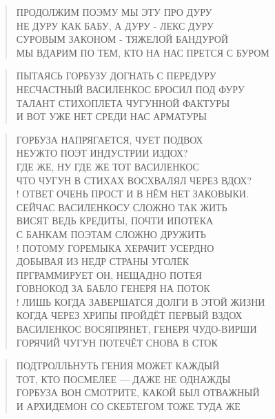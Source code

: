 \poemtitle{***}
\begin{verse}
ПРОДОЛЖИМ ПОЭМУ МЫ ЭТУ ПРО ДУРУ\\
НЕ ДУРУ КАК БАБУ, А ДУРУ - ЛЕКС ДУРУ\\
СУРОВЫМ ЗАКОНОМ - ТЯЖЕЛОЙ БАНДУРОЙ\\
МЫ ВДАРИМ ПО ТЕМ, КТО НА НАС ПРЕТСЯ С БУРОМ
\end{verse}

\poemtitle{***}
\begin{verse}
ПЫТАЯСЬ ГОРБУЗУ ДОГНАТЬ С ПЕРЕДУРУ\\
НЕСЧАСТНЫЙ ВАСИЛЕНКОС БРОСИЛ ПОД ФУРУ\\
ТАЛАНТ СТИХОПЛЕТА ЧУГУННОЙ ФАКТУРЫ\\
И ВОТ УЖЕ НЕТ СРЕДИ НАС АРМАТУРЫ
\end{verse}

\poemtitle{***}
\begin{verse}
ГОРБУЗА НАПРЯГАЕТСЯ, ЧУЕТ ПОДВОХ\\
НЕУЖТО ПОЭТ ИНДУСТРИИ ИЗДОХ?\\
ГДЕ ЖЕ, НУ ГДЕ ЖЕ ТОТ ВАСИЛЕНКОС\\
ЧТО ЧУГУН В СТИХАХ ВОСХВАЛЯЛ ЧЕРЕЗ ВДОХ?\\!
ОТВЕТ ОЧЕНЬ ПРОСТ И В НЁМ НЕТ ЗАКОВЫКИ.\\
СЕЙЧАС ВАСИЛЕНКОСУ СЛОЖНО ТАК ЖИТЬ\\
ВИСЯТ ВЕДЬ КРЕДИТЫ, ПОЧТИ ИПОТЕКА\\
С БАНКАМ ПОЭТАМ СЛОЖНО ДРУЖИТЬ\\!
ПОТОМУ ГОРЕМЫКА ХЕРАЧИТ УСЕРДНО\\
ДОБЫВАЯ ИЗ НЕДР СТРАНЫ УГОЛЁК\\
ПРГРАММИРУЕТ ОН, НЕЩАДНО ПОТЕЯ\\
ГОВНОКОД ЗА БАБЛО ГЕНЕРЯ НА ПОТОК\\!
ЛИШЬ КОГДА ЗАВЕРШАТСЯ ДОЛГИ В ЭТОЙ ЖИЗНИ\\
КОГДА ЧЕРЕЗ ХРИПЫ ПРОЙДЁТ ПЕРВЫЙ ВЗДОХ\\
ВАСИЛЕНКОС ВОСЯПРЯНЕТ, ГЕНЕРЯ ЧУДО-ВИРШИ\\
ГОРЯЧИЙ ЧУГУН ПОТЕЧЁТ СНОВА В СТОК
\end{verse}

\poemtitle{***}
\begin{verse}
ПОДТРОЛЛЬНУТЬ ГЕНИЯ МОЖЕТ КАЖДЫЙ\\
ТОТ, КТО ПОСМЕЛЕЕ — ДАЖЕ НЕ ОДНАЖДЫ\\
ГОРБУЗА ВОН СМОТРИТЕ, КАКОЙ БЫЛ ОТВАЖНЫЙ\\
И АРХИДЕМОН СО СКЕБТЕГОМ ТОЖЕ ТУДА ЖЕ
\end{verse}

